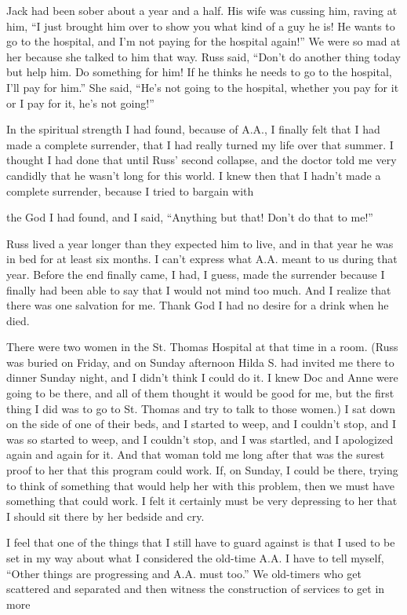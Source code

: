 \begin{biblechapter}
Jack had been sober about a year and a half. His wife was cussing him, raving at him, “I just brought him over to show you what kind of a guy he is! He wants to go to the hospital, and I’m not paying for the hospital again!” We were so mad at her because she talked to him that way. Russ said, “Don’t do another thing today but help him. Do something for him! If he thinks he needs to go to the hospital, I’ll pay for him.” She said, “He’s not going to the hospital, whether you pay for it or I pay for it, he’s not going!”

In the spiritual strength I had found, because of A.A., I finally felt that I had made a complete surrender, that I had really turned my life over that summer. I thought I had done that until Russ’ second collapse, and the doctor told me very candidly that he wasn’t long for this world. I knew then that I hadn’t made a complete surrender, because I tried to bargain with

the God I had found, and I said, “Anything but that! Don’t do that to me!”

Russ lived a year longer than they expected him to live, and in that year he was in bed for at least six months. I can’t express what A.A. meant to us during that year. Before the end finally came, I had, I guess, made the surrender because I finally had been able to say that I would not mind too much. And I realize that there was one salvation for me. Thank God I had no desire for a drink when he died.

There were two women in the St. Thomas Hospital at that time in a room. (Russ was buried on Friday, and on Sunday afternoon Hilda S. had invited me there to dinner Sunday night, and I didn’t think I could do it. I knew Doc and Anne were going to be there, and all of them thought it would be good for me, but the first thing I did was to go to St. Thomas and try to talk to those women.) I sat down on the side of one of their beds, and I started to weep, and I couldn’t stop, and I was so started to weep, and I couldn’t stop, and I was startled, and I apologized again and again for it. And that woman told me long after that was the surest proof to her that this program could work. If, on Sunday, I could be there, trying to think of something that would help her with this problem, then we must have something that could work. I felt it certainly must be very depressing to her that I should sit there by her bedside and cry.

I feel that one of the things that I still have to guard against is that I used to be set in my way about what I considered the old-time A.A. I have to tell myself, “Other things are progressing and A.A. must too.” We old-timers who get scattered and separated and then witness the construction of services to get in more


\end{biblechapter}
